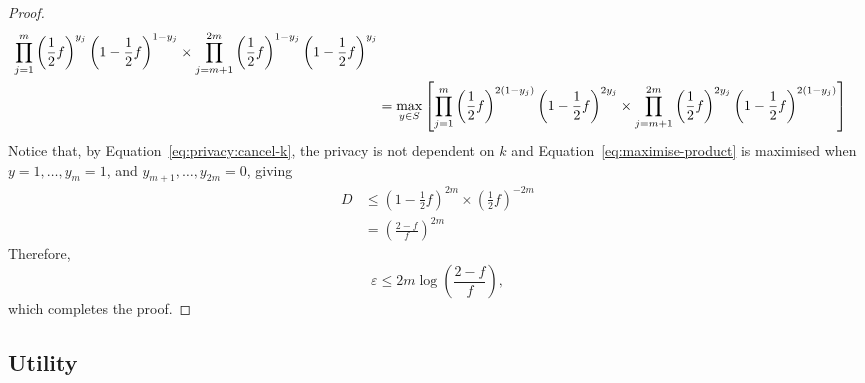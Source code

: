 \documentclass{article}
\begin{document}
\begin{proof}
\begin{align}
{			}{%
				\prod\limits_{j=1}^m \left(\frac{1}{2}f\right)^{y_j}\left(1-\frac{1}{2}f\right)^{1-y_j}%
				\times \prod\limits_{j=m+1}^{2m}\left(\frac{1}{2}f\right)^{1-y_j} \left(1-\frac{1}{2}f\right)^{y_j}%
			}\label{eq:privacy:cancel-k}\\
			&=\max_{y\in S}\left[%
				\prod\limits_{j=1}^m \left(\frac{1}{2}f\right)^{2(1-y_j)}\left(1-\frac{1}{2}f\right)^{2y_j}%
				\times \prod\limits_{j=m+1}^{2m}\left(\frac{1}{2}f\right)^{2y_j} \left(1-\frac{1}{2}f\right)^{2(1-y_j)}\right]\label{eq:maximise-product}%
	\end{align}
	Notice that, by Equation~\ref{eq:privacy:cancel-k}, the privacy is not dependent on $k$ and Equation~\ref{eq:maximise-product} is maximised when $y=1,\ldots,y_m=1$, and $y_{m+1},\ldots,y_{2m}=0$, giving
	\begin{align*}
		D &\leq \left(1-\frac{1}{2}f\right)^{2m}\times\left(\frac{1}{2}f\right)^{-2m}\\
			&= \left(\frac{2-f}{f}\right)^{2m}
	\end{align*}
	Therefore,
	\begin{equation}
		\varepsilon \leq 2m\log\left(\frac{2-f}{f}\right),
	\end{equation}
    which completes the proof.
\end{proof}

\subsection{Utility}
\end{document}
